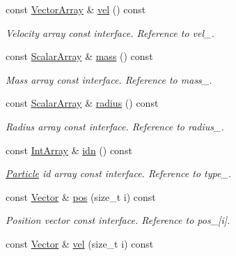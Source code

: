 \begin{DoxyCompactItemize}
const \mbox{\hyperlink{class_space_h_1_1_vel_indep_particles_aa9983058940249df8b00fa800e8cbad2}{Vector\+Array}} \& \mbox{\hyperlink{class_space_h_1_1_vel_indep_particles_a3c096b30a541cd468d6fe5f9d138b3e5}{vel}} () const
\begin{DoxyCompactList}\small\item\em Velocity array const interface. Reference to vel\+\_\+. \end{DoxyCompactList}\item 
const \mbox{\hyperlink{class_space_h_1_1_vel_indep_particles_ab5efeef52fb5748c25fbfeb04b64640e}{Scalar\+Array}} \& \mbox{\hyperlink{class_space_h_1_1_vel_indep_particles_a9d8196bf1fe404e6c50ae20a11398076}{mass}} () const
\begin{DoxyCompactList}\small\item\em Mass array const interface. Reference to mass\+\_\+. \end{DoxyCompactList}\item 
const \mbox{\hyperlink{class_space_h_1_1_vel_indep_particles_ab5efeef52fb5748c25fbfeb04b64640e}{Scalar\+Array}} \& \mbox{\hyperlink{class_space_h_1_1_vel_indep_particles_afa31f804fe6386f0036f59ae25b2175e}{radius}} () const
\begin{DoxyCompactList}\small\item\em Radius array const interface. Reference to radius\+\_\+. \end{DoxyCompactList}\item 
const \mbox{\hyperlink{class_space_h_1_1_vel_indep_particles_abe09426d740c8c2425c5fc3789c9c744}{Int\+Array}} \& \mbox{\hyperlink{class_space_h_1_1_vel_indep_particles_a6fde384478d19f53f0d325a8cda66ea5}{idn}} () const
\begin{DoxyCompactList}\small\item\em \mbox{\hyperlink{struct_space_h_1_1_particle}{Particle}} id array const interface. Reference to type\+\_\+. \end{DoxyCompactList}\item 
const \mbox{\hyperlink{class_space_h_1_1_vel_indep_particles_a61bbcfdb0dc7f99f3c68af69a755c935}{Vector}} \& \mbox{\hyperlink{class_space_h_1_1_vel_indep_particles_a542211829ba79bb89fd6212693fe06d4}{pos}} (size\+\_\+t i) const
\begin{DoxyCompactList}\small\item\em Position vector const interface. Reference to pos\+\_\+\mbox{[}i\mbox{]}. \end{DoxyCompactList}\item 
const \mbox{\hyperlink{class_space_h_1_1_vel_indep_particles_a61bbcfdb0dc7f99f3c68af69a755c935}{Vector}} \& \mbox{\hyperlink{class_space_h_1_1_vel_indep_particles_acb67afe21a29e02dd8852a31e4611905}{vel}} (size\+\_\+t i) const

\end{DoxyCompactItemize}
